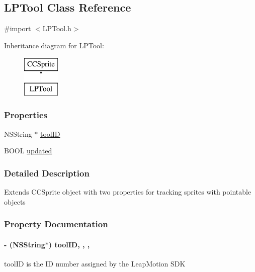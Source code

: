 \hypertarget{interface_l_p_tool}{\subsection{L\-P\-Tool Class Reference}
\label{d3/d2e/interface_l_p_tool}
}


{\ttfamily \#import $<$L\-P\-Tool.\-h$>$}

Inheritance diagram for L\-P\-Tool\-:\begin{figure}[H]
\begin{center}
\leavevmode
\includegraphics[height=2.000000cm]{d3/d2e/interface_l_p_tool}
\end{center}
\end{figure}
\subsubsection*{Properties}
\begin{DoxyCompactItemize}
\item 
N\-S\-String $\ast$ \hyperlink{interface_l_p_tool_aafbd850bbcc6c8e33ba201d45a8107c2}{tool\-I\-D}
\item 
B\-O\-O\-L \hyperlink{interface_l_p_tool_a25dbad647c537177b138bdbbb01936e4}{updated}
\end{DoxyCompactItemize}


\subsubsection{Detailed Description}
Extends C\-C\-Sprite object with two properties for tracking sprites with pointable objects 

\subsubsection{Property Documentation}
\hypertarget{interface_l_p_tool_aafbd850bbcc6c8e33ba201d45a8107c2}{
\paragraph[{tool\-I\-D}]{\setlength{\rightskip}{0pt plus 5cm}-\/ (N\-S\-String$\ast$) tool\-I\-D\hspace{0.3cm}{\ttfamily [read]}, {\ttfamily [write]}, {\ttfamily [nonatomic]}, {\ttfamily [strong]}}}\label{d3/d2e/interface_l_p_tool_aafbd850bbcc6c8e33ba201d45a8107c2}
tool\-I\-D is the I\-D number assigned by the Leap\-Motion S\-D\-K 

